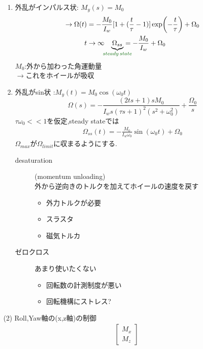 \documentclass[class=article, crop=false, dvipdfmx]{standalone}
\begin{document}
\begin{enumerate}
\item 外乱がインパルス状: $M_y(s) = M_0$\\
\begin{align}
\rightarrow \Omega(t) &= -
\frac{M_0}{I_w}[1 + 
(\frac{t}{\tau} - 1)]\exp(-\frac{t}{\tau}) + \Omega_0\\
t&\rightarrow \infty \quad
\underexpl{\Omega_{ss}}{\textcolor{darkgreen}{steady\,state}} = -\frac{M_0}{I_w} + \Omega_0
\end{align}
$M_0$:外から加わった角運動量\\
$\rightarrow$これをホイールが吸収
\item 外乱がsin状 :$M_y(t) = M_0 \cos(\omega_0 t)$\\
\begin{equation}
\Omega(s) = -
\frac{(2ts + 1)sM_0}{I_ws(\tau s + 1)^2 (s^2 + \omega_0 ^2)} + \frac{\Omega_0}{s}
\end{equation}
$\tau \omega_0 <<1$を仮定,steady stateでは
\begin{align}
 \Omega_{ss}(t) = - \frac{M_0}
 {I_w \omega_0}
 \sin(\omega_0 t) + \Omega_0
\end{align}
$\Omega_{max}$が$\Omega_{limit}$に収まるようにする.



\begin{description}
\item [desaturation](momentum unloading)\\
外から逆向きのトルクを加えてホイールの速度を戻す
\begin{itemize}
\item 外力トルクが必要
\item スラスタ
\item 磁気トルカ
\end{itemize}
\item [ゼロクロス]あまり使いたくない
\begin{itemize}
\item 回転数の計測制度が悪い
\item 回転機構にストレス?
\end{itemize}
\end{description}
\end{enumerate}
(2) Roll,Yaw軸の(x,z軸)の制御\\
\begin{align}
 \begin{bmatrix}
   M_x\\
   M_z
 \end{bmatrix}
\end{align}
\end{document}
